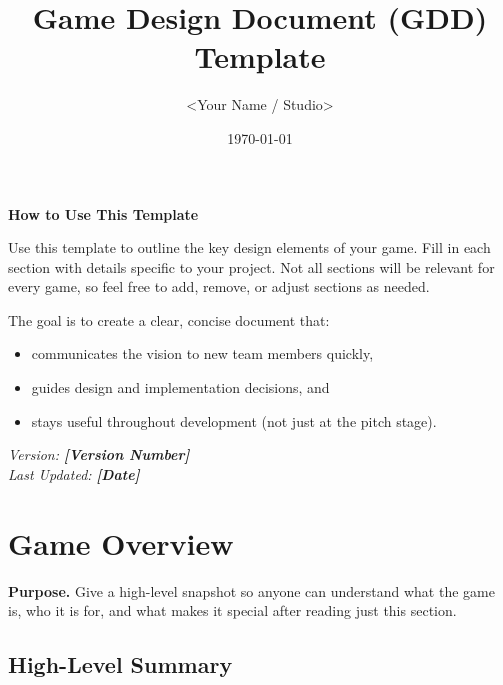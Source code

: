 \documentclass[12pt]{article}
\title{Game Design Document (GDD) Template}
\author{<Your Name / Studio>}
\date{\today}
\newcommand{\placeholder}[1]{\textbf{\textit{[#1]}}}
\begin{document}
\raggedright

\maketitle
\thispagestyle{empty}

\begin{center}
    \vspace{1em}
    \textbf{How to Use This Template}
\end{center}

Use this template to outline the key design elements of your game. Fill in each section with
details specific to your project. Not all sections will be relevant for every game, so feel free
to add, remove, or adjust sections as needed.

The goal is to create a clear, concise document that:
\begin{itemize}
  \item communicates the vision to new team members quickly,
  \item guides design and implementation decisions, and
  \item stays useful throughout development (not just at the pitch stage).
\end{itemize}

\vfill
\begin{center}
    \textit{Version:} \placeholder{Version Number} \\
    \textit{Last Updated:} \placeholder{Date}
\end{center}

\setcounter{tocdepth}{2}
\newpage
\tableofcontents
\newpage

\section{Game Overview}

\textbf{Purpose.} Give a high-level snapshot so anyone can understand what the game is, who it is for,
and what makes it special after reading just this section.

\subsection{High-Level Summary}
\end{document}
